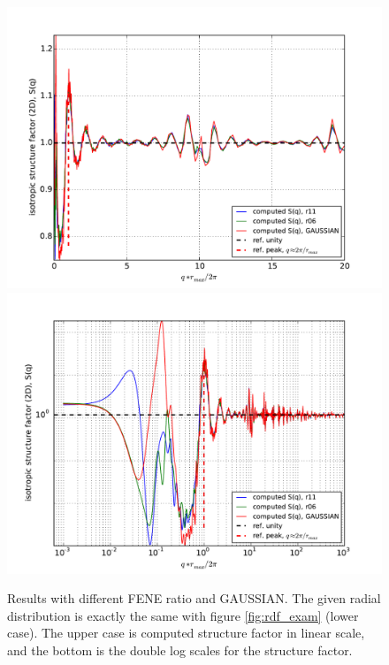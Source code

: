 \documentclass[10pt, a4paper]{report}
\begin{document}
\begin{appendices}
    \begin{figure}
      \centering
      \includegraphics[width=\textwidth]{figures/Sq_compare_linear.pdf}\\
      \includegraphics[width=\textwidth]{figures/Sq_compare_log.pdf}
      \caption{Results with different FENE ratio and GAUSSIAN. The given radial distribution is exactly the same with figure \ref{fig:rdf_exam} (lower case). The upper case is computed structure factor in linear scale, and the bottom is the double log scales for the structure factor.}
      \label{fig:2d_Sq_compare}
    \end{figure}


\end{appendices}
\end{document}
